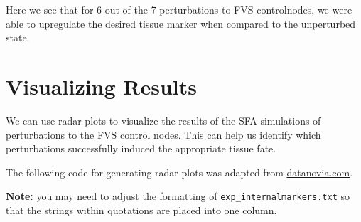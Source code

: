 \documentclass[
]{book}
\newenvironment{Shaded}{\begin{snugshade}}{\end{snugshade}}
\newcommand{\CommentTok}[1]{\textcolor[rgb]{0.56,0.35,0.01}{\textit{#1}}}
\newcommand{\ControlFlowTok}[1]{\textcolor[rgb]{0.13,0.29,0.53}{\textbf{#1}}}
\newcommand{\DataTypeTok}[1]{\textcolor[rgb]{0.13,0.29,0.53}{#1}}
\newcommand{\DecValTok}[1]{\textcolor[rgb]{0.00,0.00,0.81}{#1}}
\newcommand{\FloatTok}[1]{\textcolor[rgb]{0.00,0.00,0.81}{#1}}
\newcommand{\KeywordTok}[1]{\textcolor[rgb]{0.13,0.29,0.53}{\textbf{#1}}}
\newcommand{\NormalTok}[1]{#1}
\newcommand{\OtherTok}[1]{\textcolor[rgb]{0.56,0.35,0.01}{#1}}
\newcommand{\StringTok}[1]{\textcolor[rgb]{0.31,0.60,0.02}{#1}}
\begin{document}
Here we see that for 6 out of the 7 perturbations to FVS controlnodes, we were able to upregulate the desired tissue marker when compared to the unperturbed state.

\hypertarget{visualizing-results}{%
\section{Visualizing Results}\label{visualizing-results}}

We can use radar plots to visualize the results of the SFA simulations of perturbations to the FVS control nodes. This can help us identify which perturbations successfully induced the appropriate tissue fate.

The following code for generating radar plots was adapted from \href{https://www.google.com/search?q=create+_beautiful_+radar+chart\&oq=create+beautiful+rada\&aqs=chrome.1.69i57j0i10i22i30.11973j0j1\&sourceid=chrome\&ie=UTF-8}{datanovia.com}.

\textbf{Note: } you may need to adjust the formatting of \texttt{exp\_internalmarkers.txt} so that the strings within quotations are placed into one column.

\begin{Shaded}
\end{Shaded}
\end{document}
